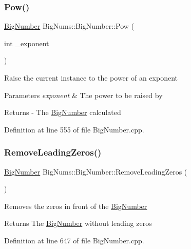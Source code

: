 \subsubsection{\texorpdfstring{Pow()}{Pow()}}
{\footnotesize\ttfamily \mbox{\hyperlink{class_big_nums_1_1_big_number}{Big\+Number}} Big\+Nums\+::\+Big\+Number\+::\+Pow (\begin{DoxyParamCaption}\item[{int}]{\+\_\+exponent }\end{DoxyParamCaption})}

Raise the current instance to the power of an exponent 
\begin{DoxyParams}{Parameters}
{\em exponent} & The power to be raised by \\
\hline
\end{DoxyParams}
\begin{DoxyReturn}{Returns}
-\/ The \mbox{\hyperlink{class_big_nums_1_1_big_number}{Big\+Number}} calculated 
\end{DoxyReturn}


Definition at line 555 of file Big\+Number.\+cpp.

\mbox{\label{class_big_nums_1_1_big_number_a440be0c0feaf4be408ed8f7fa6b42926}} 
\subsubsection{\texorpdfstring{RemoveLeadingZeros()}{RemoveLeadingZeros()}}
{\footnotesize\ttfamily \mbox{\hyperlink{class_big_nums_1_1_big_number}{Big\+Number}} Big\+Nums\+::\+Big\+Number\+::\+Remove\+Leading\+Zeros (\begin{DoxyParamCaption}{ }\end{DoxyParamCaption})}

Removes the zeros in front of the \mbox{\hyperlink{class_big_nums_1_1_big_number}{Big\+Number}} \begin{DoxyReturn}{Returns}
The \mbox{\hyperlink{class_big_nums_1_1_big_number}{Big\+Number}} without leading zeros 
\end{DoxyReturn}


Definition at line 647 of file Big\+Number.\+cpp.

\mbox{\label{class_big_nums_1_1_big_number_a7e47aaceaeacdfa5685158daa230dbfd}} 
